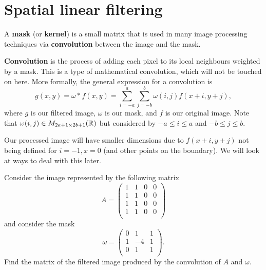 \chapter{Spatial linear filtering}

\begin{definition}[Mask]
    A \textbf{mask} (or \textbf{kernel}) is a small matrix that is used in many image processing techniques via \textbf{convolution} between the image and the mask.
\end{definition}

\begin{definition}[Convolution]
    \textbf{Convolution} is the process of adding each pixel to its local neighbours weighted by a mask. 
    This is a type of mathematical convolution, which will not be touched on here.
    More formally, the general expression for a convolution is
    \[ g(x, y) = \omega * f(x, y) = \sum_{i = -a}^a \sum_{j = -b}^{b} \omega(i, j) f(x + i, y + j), \]
    where $g$ is our filtered image, $\omega$ is our mask, and $f$ is our original image. Note that $\omega(i, j) \in M_{2a + 1 \times 2b + 1}(\mathbb{R})$ but considered by $-a \leq i \leq a$ and $-b \leq j \leq b$.
\end{definition}

\begin{remark}
    Our processed image will have smaller dimensions due to $f(x + i, y + j)$ not being defined for $i = -1, x = 0$ (and other points on the boundary). We will look at ways to deal with this later.
\end{remark}

\begin{example}
    Consider the image represented by the following matrix
    \[
        A =
        \begin{pmatrix}
            1 & 1 & 0 & 0 \\
            1 & 1 & 0 & 0 \\
            1 & 1 & 0 & 0 \\
            1 & 1 & 0 & 0 \\
        \end{pmatrix}
    \]
    and consider the mask
    \[
        \omega =
        \begin{pmatrix}
            0 & 1  & 1 \\
            1 & -4 & 1 \\
            0 & 1  & 1 \\
        \end{pmatrix}
        .
    \]
    Find the matrix of the filtered image produced by the convolution of $A$ and $\omega$.
\end{example}

